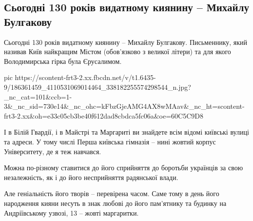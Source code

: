  
 
 
 
 
\subsection{Сьогодні 130 років видатному киянину – Михайлу Булгакову}

Сьогодні 130 років видатному киянину – Михайлу Булгакову. Письменнику, який
називав Київ найкращим  Містом (обов’язково з великої літери) та для якого
Володимирська гірка була Єрусалимом.

\ifcmt
  pic https://scontent-frt3-2.xx.fbcdn.net/v/t1.6435-9/186361459_4110531069014464_338182255574298544_n.jpg?_nc_cat=101&ccb=1-3&_nc_sid=730e14&_nc_ohc=kFbzGjeAMG4AX8wMAav&_nc_ht=scontent-frt3-2.xx&oh=e33c05cb3be40f612dad8cbdca5fc06a&oe=60C5C9D8
\fi

І в Білій Гвардії, і в Майстрі та Маргариті ви знайдете всім відомі київські
вулиці та адреси. У тому числі Перша київська гімназія – нині жовтий корпус
Університету, де я теж навчався.

Можна по-різному ставитися до його сприйняття до боротьби українців за свою
незалежність, як і до його несприйняття радянської влади. 

Але геніальність його творів – перевірена часом. Саме тому в день його
народження кияни несуть в знак любові до його пам’ятнику та будинку на
Андріївському узвозі, 13 – жовті маргаритки.


